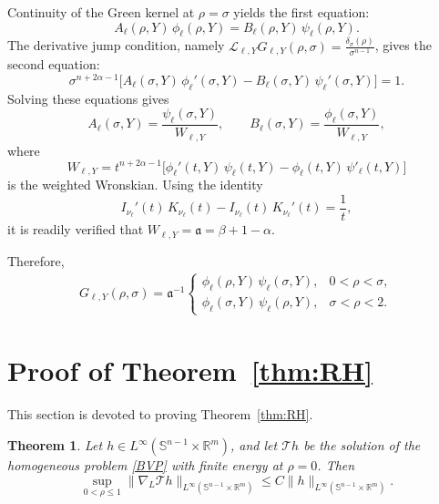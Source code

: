 \documentclass[12pt]{amsart}
\newtheorem{theorem}{Theorem}[section]
\begin{document}
Continuity of the Green kernel at $\rho=\sigma$ yields the first equation:
\begin{equation*}
    A_\ell(\rho,Y) \, \phi_{\ell}(\rho, Y) = B_\ell(\rho,Y) \, \psi_{\ell}(\rho, Y).
\end{equation*}
The derivative jump condition, namely $\mathcal{L}_{\ell,Y}G_{\ell,Y}(\rho,\sigma) = \frac{\delta_{\sigma}(\rho)}{\sigma^{n-1}}$, gives the second equation:
\begin{equation*}
    \sigma^{n+2\alpha-1} \bigl[ A_\ell(\sigma,Y) \, \phi_{\ell}'(\sigma,Y) - B_\ell(\sigma,Y) \, \psi_{\ell}'(\sigma,Y) \bigr] = 1.
\end{equation*}
Solving these equations gives
\begin{equation*}
    A_\ell(\sigma,Y) = \frac{\psi_{\ell}(\sigma,Y)}{W_{\ell,Y}}, \qquad B_\ell(\sigma,Y) = \frac{\phi_{\ell}(\sigma,Y)}{W_{\ell,Y}},
\end{equation*}
where
\begin{equation*}
    W_{\ell,Y} = t^{n+2\alpha-1} \bigl[ \phi_{\ell}'(t,Y) \, \psi_\ell(t,Y) - \phi_{\ell}(t,Y) \, \psi'_\ell(t,Y) \bigr]
\end{equation*}
is the weighted Wronskian. Using the identity
\begin{equation*}
    I_{\nu_\ell}'(t) \, K_{\nu_\ell}(t) - I_{\nu_\ell}(t) \, K_{\nu_\ell}'(t) = \frac{1}{t},
\end{equation*}
it is readily verified that $W_{\ell,Y} = \mathfrak a = \beta+1-\alpha$.

Therefore,
\begin{align}\label{eq_kernel_Green}
    G_{\ell,Y}(\rho,\sigma) = \mathfrak a^{-1}
    \begin{cases}
        \phi_{\ell}(\rho,Y) \, \psi_{\ell}(\sigma,Y), & 0 < \rho < \sigma,\\[4pt]
        \phi_{\ell}(\sigma,Y) \, \psi_{\ell}(\rho,Y), & \sigma < \rho < 2.
    \end{cases}
\end{align}





\section{Proof of Theorem~\ref{thm:RH}}


This section is devoted to proving Theorem~\ref{thm:RH}.

\begin{theorem}\label{lem:Poisson_kernel}
Let $h\in L^\infty(\mathbb{S}^{n-1} \times \mathbb{R}^m)$, and let $\mathcal{T}h$ be the solution of the homogeneous problem \eqref{BVP} with finite energy at $\rho=0$. Then
\begin{equation*}
    \sup_{0<\rho\le 1} \bigl\| \nabla_L \mathcal{T}h \bigr\|_{L^\infty(\mathbb{S}^{n-1} \times \mathbb{R}^m)} \le C \|h\|_{L^\infty(\mathbb{S}^{n-1} \times \mathbb{R}^m)}.
\end{equation*}
\end{theorem}
\end{document}

